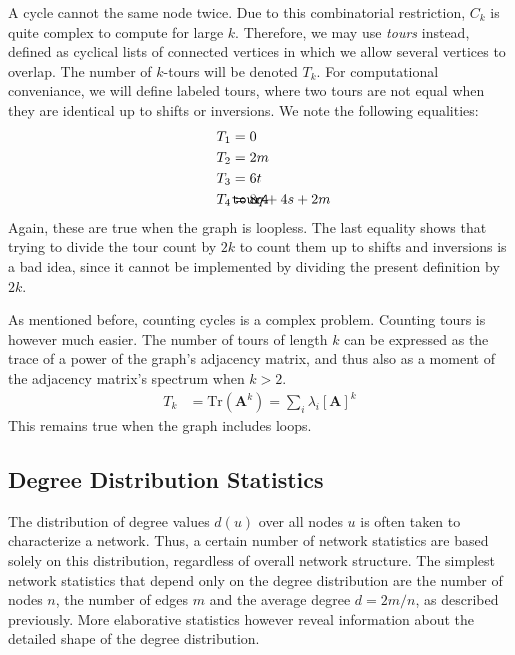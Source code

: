 \documentclass{article}
\def\mathnote#1{%
  \tag*{\rlap{\hspace\marginparsep\smash{\parbox[t]{\marginparwidth}{#1}}}}
}
\begin{document}
A cycle cannot the same node twice.  Due to this combinatorial
restriction, $C_k$ is quite complex to compute for large $k$.
Therefore, we may use \emph{tours} instead, defined as cyclical lists of
connected vertices in which we allow several vertices to overlap.  The
number of $k$-tours will be denoted $T_k$.  For computational
conveniance, we will define labeled tours, where two tours are not equal
when they are identical up to shifts or inversions.  
We note the following equalities: 
\begin{align}
  T_1 &= 0 \nonumber \\
  T_2 &= 2m \nonumber \\
  T_3 &= 6t \nonumber \\
  \mathnote{\texttt{tour4}}
  T_4 &= 8q + 4s + 2m 
\end{align}
Again, these are true when the graph is loopless.  The last equality
shows that trying to divide the tour count by $2k$ to count them up to
shifts and inversions is a bad idea, since it cannot be implemented by
dividing the present definition by $2k$. 

As mentioned before, counting cycles is a complex problem.  Counting
tours is however much easier.  The number of tours of length $k$ can be
expressed as the trace of a power of the graph's adjacency matrix, and
thus also as a moment of the adjacency matrix's spectrum when $k > 2$.  
\begin{align}
  T_k &= \mathrm{Tr}(\mathbf A^k) = \sum_i \lambda_i[\mathbf A]^k
\end{align}
This remains true when the graph includes loops.  

\subsection{Degree Distribution Statistics}
The distribution of degree values $d(u)$ over all nodes $u$ is often
taken to characterize a network.  Thus, a certain number of network
statistics are based solely on this distribution, regardless of overall
network structure.  
The simplest network statistics that depend only on the degree
distribution are the number of nodes $n$, the number of edges $m$ and
the average degree $d=2m/n$, as described previously.  More elaborative
statistics however reveal information about the detailed shape of the
degree distribution. 
\end{document}
